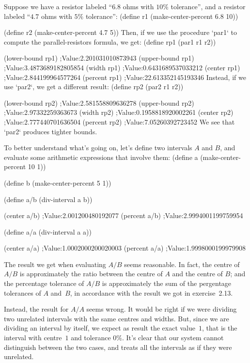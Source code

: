 Suppose we have a resistor labeled “$6.8$ ohms with $10\%$ tolerance”, and a resistor labeled “$4.7$ ohms with $5\%$ tolerance”:
\begtt\scm
(define r1 (make-center-percent 6.8 10))

(define r2 (make-center-percent 4.7 5))
\endtt
Then, if we use the procedure `par1` to compute the parallel-resistors formula, we get:
\begtt\scm
(define rp1 (par1 r1 r2))

(lower-bound rp1)
;Value:2.201031010873943
(upper-bound rp1)
;Value:3.4873689182805854
(width rp1)
;Value:0.6431689537033212
(center rp1)
;Value:2.844199964577264
(percent rp1)
;Value:22.613352145193346
\endtt
Instead, if we use `par2`, we get a different result:
\begtt\scm
(define rp2 (par2 r1 r2))

(lower-bound rp2)
;Value:2.581558809636278
(upper-bound rp2)
;Value:2.97332259363673
(width rp2)
;Value:0.1958818920002261
(center rp2)
;Value:2.777440701636504
(percent rp2)
;Value:7.05260392723452
\endtt
We see that `par2` produces tighter bounds.

To better understand what's going on, let's define two intervals $A$ and $B$, and evaluate some arithmetic expressions that involve them:
\begtt\scm
(define a (make-center-percent 10 1))

(define b (make-center-percent 5 1))

(define a/b (div-interval a b))

(center a/b)
;Value:2.001200480192077
(percent a/b)
;Value:2.9994001199759954

(define a/a (div-interval a a))

(center a/a)
;Value:1.0002000200020003
(percent a/a)
;Value:1.9998000199979908
\endtt

The result we get when evaluating $A/B$ seems reasonable.  In fact, the centre of $A/B$ is approximately the ratio between the centre of $A$ and the centre of $B$; and the percentage tolerance of $A/B$ is approximately the sum of the pergentage tolerances of $A$ and~$B$, in accordance with the result we got in exercise~2.13.

Instead, the result for $A/A$ seems wrong.  It would be right if we were dividing two unrelated intervals with the same centres and widths.  But, since we are dividing an interval by itself, we expect as result the exact value~$1$, that is the interval with centre~$1$ and tolerance $0\%$.  It's clear that our system cannot distinguish between the two cases, and treats all the intervals as if they were unrelated.
